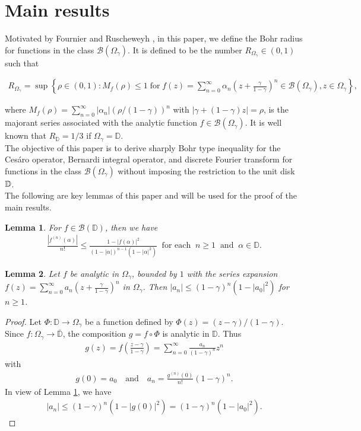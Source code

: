 \documentclass[11pt,reqno]{amsart}
\newtheorem{lem}{Lemma}[section]
\newtheorem{open problem}{Open problem}[section]
\newcommand{\ol}{\overline}
\newcommand{\bs}{\begin{small}}
\newcommand{\es}{\end{small}}
\newcommand{\beas}{\begin{eqnarray*}}
\newcommand{\eeas}{\end{eqnarray*}}
\numberwithin{equation}{section}
\begin{document}
\section{Main results}
Motivated by Fournier and Ruscheweyh \cite{10}, in this paper, we define the Bohr radius for functions in the class $\mathcal{B}(\Omega_{\gamma})$. It is defined to be the 
number 
$R_{\Omega_{\gamma}}\in (0, 1)$ such that 
\bs\beas R_{\Omega_{\gamma}}=\sup\left\{\rho\in (0,1):M_f(\rho)\leq 1\;\text{for} \;f(z)=\sum_{n=0}^{\infty}\alpha_n\left(z+\frac{\gamma}{1-\gamma}\right)^n\in\mathcal{B}(\Omega_{\gamma}), z\in\Omega_{\gamma}\right\},\eeas \es
where $M_f(\rho)=\sum_{n=0}^{\infty}|\alpha_n|\left(\rho/(1-\gamma)\right)^n$ with $|\gamma+(1-\gamma)z|=\rho$, is the majorant series associated with the analytic function $f\in\mathcal{B}(\Omega_{\gamma})$. It is well known that $R_{\mathbb{D}} = 1/3$ if $\Omega_{\gamma}=\mathbb{D}$.\\[2mm]
\indent 
The objective of this paper is to derive sharply Bohr type inequality for the Ces\'aro operator, Bernardi integral operator, and discrete Fourier transform for functions in the class 
$\mathcal{B}(\Omega_{\gamma})$ without imposing the restriction to the unit disk $\Bbb{D}$.\\[2mm]
\indent The following are key lemmas of this paper and will be used for the proof of the main results.
\begin{lem}\cite{26a}\label{lem1} For $f\in\mathcal{B}(\mathbb{D})$, then we have 
\beas \frac{\left|f^{(n)}(\alpha)\right|}{n!}\leq \frac{1-|f(\alpha)|^2}{(1-|\alpha|)^{n-1}(1-|\alpha|^2)}\;\;\text{for each}\;\; n\geq 1\;\;\text{and}\;\; \alpha\in\mathbb{D}.\eeas\end{lem}
\begin{lem}\label{lem2}Let $f$ be analytic in $\Omega_{\gamma}$, bounded by $1$ with the series expansion $f(z)=\sum_{n=0}^\infty a_n\left(z+\frac{\gamma}{1-\gamma}\right)^n$ in $\Omega_{\gamma}$. Then $|a_n|\leq (1-\gamma)^n(1-|a_0|^2)$ for $n\geq 1$.\end{lem}
\begin{proof} Let $\Phi : \mathbb{D}\to\Omega_{\gamma}$ be a function defined by $\Phi(z)=(z-\gamma)/(1-\gamma)$. Since $f : \Omega_{\gamma}\to\ol{\mathbb{D}}$, 
the composition $g=f\circ \Phi$ is analytic in $\mathbb{D}$. Thus 
\beas g(z)=f\left(\frac{z-\gamma}{1-\gamma}\right)=\sum_{n=0}^\infty \frac{a_n}{(1-\gamma)^n}z^n\eeas
with
\beas g(0)=a_0\quad\text{and}\quad a_n=\frac{g^{(n)}(0)}{n!}(1-\gamma)^n.\eeas
In view of \textrm{Lemma \ref{lem1}}, we have 
\beas|a_n|\leq (1-\gamma)^n\left(1-|g(0)|^2\right)=(1-\gamma)^n\left(1-|a_0|^2\right).\eeas\end{proof}
\end{document}

